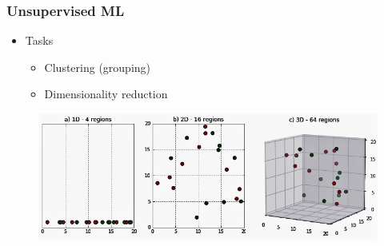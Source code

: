 \begin{frame}\frametitle{Unsupervised ML}
   \begin{itemize}
      \item Tasks
      \begin{itemize}
         \item Clustering (grouping)
         \item Dimensionality reduction
      \end{itemize}
   \end{itemize}
   \begin{figure}[H]
      \includegraphics[scale=.35]{../images/illustrations/model_dimension_reduction.png}
   \end{figure}
\end{frame}


